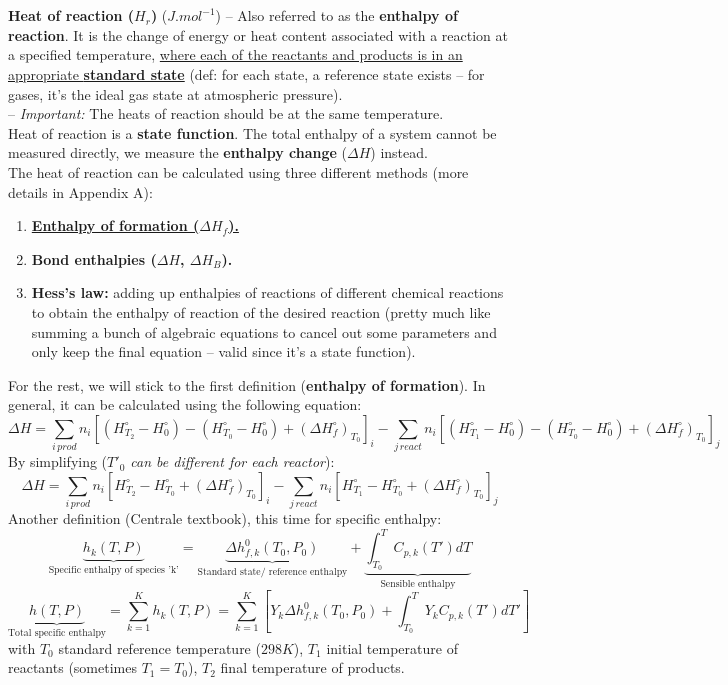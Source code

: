 \documentclass[a4paper,11pt]{article}
\begin{document}
\\ \\
\indent 
\textbf{Heat of reaction ($H_r$)} ($J.mol^{-1}$) -- Also referred to as the \textbf{enthalpy of reaction}. It is the change of energy or heat content associated with a reaction at a specified temperature, \underline{where each of the reactants and products is in an appropriate \textbf{standard state}} (def: for each state, a reference state exists -- for gases, it's the ideal gas state at atmospheric pressure). \\
-- \emph{Important:} The heats of reaction should be at the same temperature.\\
Heat of reaction is a \textbf{state function}. The total enthalpy of a system cannot be measured directly, we measure the \textbf{enthalpy change} ($\Delta H$) instead.\\
The heat of reaction can be calculated using three different methods (more details in Appendix A):
\begin{enumerate}
    \item \underline{\textbf{Enthalpy of formation ($\Delta H_f$).}}
    \item \textbf{Bond enthalpies ($\Delta H$, $\Delta H_B$).}
    \item \textbf{Hess's law:} adding up enthalpies of reactions of different chemical reactions to obtain the enthalpy of reaction of the desired reaction (pretty much like summing a bunch of algebraic equations to cancel out some parameters and only keep the final equation -- valid since it's a state function).
\end{enumerate}
For the rest, we will stick to the first definition (\textbf{enthalpy of formation}). In general, it can be calculated using the following equation:
\[\Delta H = \sum _{i\,prod} n_i[(H^{\circ}_{T_2}-H^{\circ}_{0})-(H^{\circ}_{T_0}-H^{\circ}_{0})+(\Delta H^{\circ}_f)_{T_0}]_i
- \sum _{j\,react} n_i[(H^{\circ}_{T_1}-H^{\circ}_{0})-(H^{\circ}_{T_0}-H^{\circ}_{0})+(\Delta H^{\circ}_f)_{T_0}]_j\]
By simplifying (\emph{$T'_0$ can be different for each reactor}):
\[\Delta H = \sum _{i\,prod} n_i[H^{\circ}_{T_2}-H^{\circ}_{T_0}+(\Delta H^{\circ}_f)_{T_0}]_i
- \sum _{j\,react} n_i[H^{\circ}_{T_1}-H^{\circ}_{T_0}+(\Delta H^{\circ}_f)_{T_0}]_j\]
Another definition (Centrale textbook), this time for specific enthalpy:
\[\underbrace{h_k (T,P)}_\textrm{Specific enthalpy of species 'k'} = \underbrace{\Delta h^0_{f,k}(T_0,P_0)}_\textrm{Standard state/ reference enthalpy}+\underbrace{\int_{T_0}^{T}C_{p,k}(T')dT}_\textrm{Sensible enthalpy}\]
\[\underbrace{h (T,P)}_\textrm{Total specific enthalpy} = \sum^K_{k=1} h_k(T,P) =\sum^{K}_{k=1}[Y_k\Delta h^0_{f,k}(T_0,P_0)+\int_{T_0}^{T}Y_kC_{p,k}(T')dT']\]
with $T_0$ standard reference temperature ($298 K$), $T_1$ initial temperature of reactants (sometimes $T_1=T_0$), $T_2$ final temperature of products.
\end{document}
